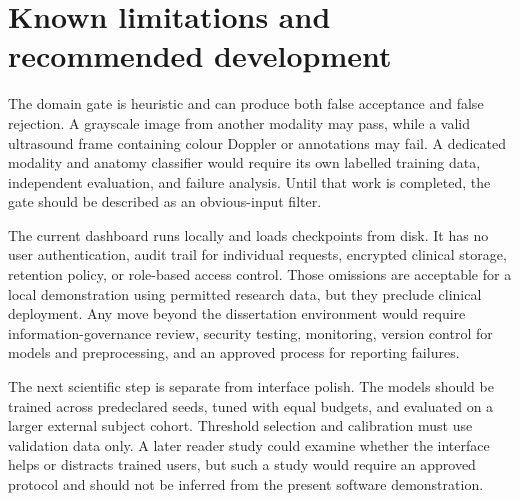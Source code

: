 \section{Known limitations and recommended development}

The domain gate is heuristic and can produce both false acceptance and false rejection. A grayscale image from another modality may pass, while a valid ultrasound frame containing colour Doppler or annotations may fail. A dedicated modality and anatomy classifier would require its own labelled training data, independent evaluation, and failure analysis. Until that work is completed, the gate should be described as an obvious-input filter.

The current dashboard runs locally and loads checkpoints from disk. It has no user authentication, audit trail for individual requests, encrypted clinical storage, retention policy, or role-based access control. Those omissions are acceptable for a local demonstration using permitted research data, but they preclude clinical deployment. Any move beyond the dissertation environment would require information-governance review, security testing, monitoring, version control for models and preprocessing, and an approved process for reporting failures.

The next scientific step is separate from interface polish. The models should be trained across predeclared seeds, tuned with equal budgets, and evaluated on a larger external subject cohort. Threshold selection and calibration must use validation data only. A later reader study could examine whether the interface helps or distracts trained users, but such a study would require an approved protocol and should not be inferred from the present software demonstration.
